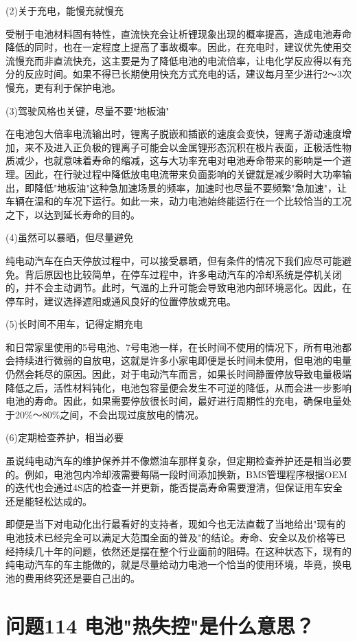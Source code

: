 \documentclass[12pt,UTF8]{ctexbook}
\begin{document}
(2)关于充电，能慢充就慢充

受制于电池材料固有特性，直流快充会让析锂现象出现的概率提高，造成电池寿命降低的同时，也在一定程度上提高了事故概率。因此，在充电时，建议优先使用交流慢充而非直流快充，这主要是为了降低电池的电流倍率，让电化学反应得以有充分的反应时间。如果不得已长期使用快充方式充电的话，建议每月至少进行2～3次慢充，更有利于保护电池。

(3)驾驶风格也关键，尽量不要"地板油"

在电池包大倍率电流输出时，锂离子脱嵌和插嵌的速度会变快，锂离子游动速度增加，来不及进入正负极的锂离子可能会以金属锂形态沉积在极片表面，正极活性物质减少，也就意味着寿命的缩减，这与大功率充电对电池寿命带来的影响是一个道理。因此，在行驶过程中降低放电电流带来负面影响的关键就是减少瞬时大功率输出，即降低"地板油"这种急加速场景的频率，加速时也尽量不要频繁"急加速"，让车辆在温和的车况下运行。如此一来，动力电池始终能运行在一个比较恰当的工况之下，以达到延长寿命的目的。

(4)虽然可以暴晒，但尽量避免

纯电动汽车在白天停放过程中，可以接受暴晒，但有条件的情况下我们应尽可能避免。背后原因也比较简单，在停车过程中，许多电动汽车的冷却系统是停机关闭的，并不会主动调节。此时，气温的上升可能会导致电池内部环境恶化。因此，在停车时，建议选择遮阳或通风良好的位置停放或充电。

(5)长时间不用车，记得定期充电

和日常家里使用的5号电池、7号电池一样，在长时间不使用的情况下，所有电池都会持续进行微弱的自放电，这就是许多小家电即便是长时间未使用，但电池的电量仍然会耗尽的原因。因此，对于电动汽车而言，如果长时间静置停放导致电量极端降低之后，活性材料钝化，电池包容量便会发生不可逆的降低，从而会进一步影响电池的寿命。因此，如果需要停放很长时间，最好进行周期性的充电，确保电量处于20\%～80\%之间，不会出现过度放电的情况。

(6)定期检查养护，相当必要

虽说纯电动汽车的维护保养并不像燃油车那样复杂，但定期检查养护还是相当必要的。例如，电池包内冷却液需要每隔一段时间添加换新，BMS管理程序根据OEM的迭代也会通过4S店的检查一并更新，能否提高寿命需要澄清，但保证用车安全还是能轻松达成的。

即便是当下对电动化出行最看好的支持者，现如今也无法直截了当地给出"现有的电池技术已经完全可以满足大范围全面的普及"的结论。寿命、安全以及价格等已经持续几十年的问题，依然还是摆在整个行业面前的阻碍。在这种状态下，现有的纯电动汽车的车主能做的，就是尽量给动力电池一个恰当的使用环境，毕竟，换电池的费用终究还是要自己出的。

\section{问题114 电池"热失控"是什么意思？}
\end{document}
